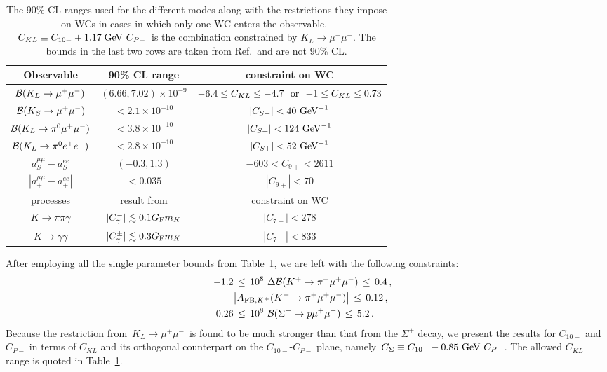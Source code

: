 \documentclass[amsmath,amssymb,aps,nofootinbib,prd,preprint,superscriptaddress,tightenlines,a4paper,bm]{revtex4-2}
\begin{document}
\begin{table}[t]
\centering \setlength{\tabcolsep}{2ex}
\begin{tabular}{|c|c|c|} \hline
Observable & 90\% CL range & constraint on WC \\ \hline
${\cal B}(K_L\to \mu^+\mu^-)$ \cite{Workman:2022ynf}& $(6.66,7.02)\times 10^{-9}$ & $-6.4\leq C_{KL}\leq-4.7 {\rm ~~or~~} {-}1\leq C_{KL}\leq0.73$\\
${\cal B}(K_S\to \mu^+\mu^-)$\cite{LHCb:2020ycd}& $<2.1\times 10^{-10}$ & $|C_{S-}|<40{\rm~GeV}^{-1}$ \\
${\cal B}(K_L\to \pi^0\mu^+\mu^-)$\cite{AlaviHarati:2000hs}& $< 3.8\times 10^{-10}$ & $|C_{S+}| < 124 {\rm~GeV}^{-1}$ \\
${\cal B}(K_L\to \pi^0e^+e^-)$\cite{AlaviHarati:2003mr}& $< 2.8\times 10^{-10}$ & $|C_{S+}|< 52 {\rm~GeV}^{-1}$ \\
$a_S^{\mu\mu}-a_S^{ee}$ & $(-0.3,1.3)$ &  $-603<C_{9+}<2611$ \\
$ |a_+^{\mu\mu}-a_+^{ee}|$ & $< 0.035$ &  $|C_{9+}| < 70$ \\ \hline
processes & result from \cite{Mertens:2011ts} & constraint on WC\\ \hline
$K\to \pi \pi\gamma$ \cite{Mertens:2011ts} & $ | C^-_\gamma|\lesssim 0.1 G_{\rm F}m_K$ &  $|C_{7-}|<278$ \\
$K\to \gamma\gamma$ \cite{Mertens:2011ts}& $| C^{\pm}_\gamma|\lesssim 0.3 G_{\rm F}m_K$  &  $|C_{7\pm}|<833$\\ \hline
\end{tabular}
\caption{The 90\% CL ranges used for the different modes along with the restrictions they impose on WCs in cases in which only one WC enters the observable.
\,$C_{KL}\equiv C_{10-}+1.17\;{\rm GeV}~C_{P-}$\, is the combination constrained by $K_L\to\mu^+\mu^-$.
The bounds in the last two rows are taken from Ref.\,\cite{Mertens:2011ts} and are not 90\% CL.}
\label{t:constraints}
\end{table}

After employing all the single parameter bounds from Table~\ref{t:constraints}, we are left with the following constraints:
\begin{align}
   -1.2 & \,\leq\, 10^8~\Delta{\cal B}(K^+\to\pi^+\mu^+\mu^-) \,\leq\, 0.4 \,, \nonumber \\ &
    \big|A_{{\rm FB},K^+}(K^+\to\pi^+\mu^+\mu^-)\big| \,\leq\, 0.12 \,, \nonumber \\
    0.26 & \,\leq\, 10^8~{\cal B}(\Sigma^+ \to p \mu^+\mu^-) \,\leq\, 5.2 \,. &
    \label{eq:constraints}
\end{align}
Because the restriction from \,$K_L\to \mu^+\mu^-$\, is found to be much stronger than that from the $\Sigma^+$ decay, we present the results for  $C_{10-}$ and $C_{P-}$ in terms of $C_{KL}$ and its orthogonal counterpart on the $C_{10-}$-$C_{P-}$ plane, namely \,$C_{\Sigma}\equiv C_{10-}-0.85 {\rm ~GeV}~C_{P-}$.
The allowed $C_{KL}$ range is quoted in Table~\ref{t:constraints}.
\end{document}

